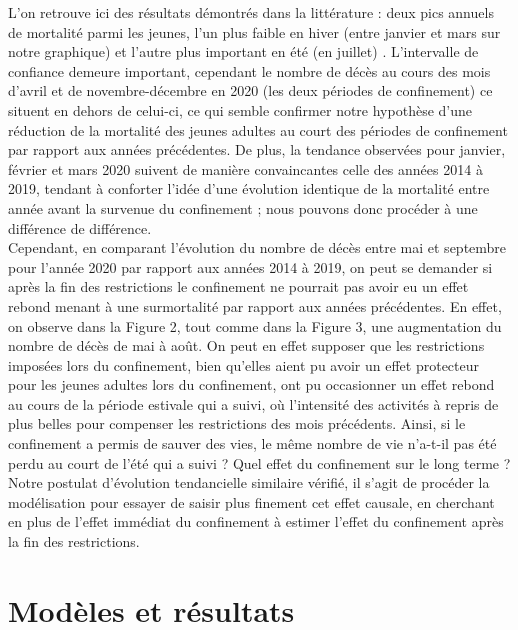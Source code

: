 \documentclass[titlepage]{article}
\begin{document}
L'on retrouve ici des résultats démontrés dans la littérature : deux pics annuels de mortalité parmi les jeunes, l'un plus faible en hiver (entre janvier et mars sur notre graphique) et l'autre plus important en été (en juillet)  \parencite{breton_levolution_2019}. L'intervalle de confiance demeure important, cependant le nombre de décès au cours des mois d'avril et de novembre-décembre en 2020 (les deux périodes de confinement) ce situent en dehors de celui-ci, ce qui semble confirmer notre hypothèse d'une réduction de la mortalité des jeunes adultes au court des périodes de confinement par rapport aux années précédentes. De plus, la tendance observées pour janvier, février et mars 2020 suivent de manière convaincantes celle des années 2014 à 2019, tendant à conforter l'idée d'une évolution identique de la mortalité entre année avant la survenue du confinement ; nous pouvons donc procéder à une différence de différence. \\

Cependant, en comparant l'évolution du nombre de décès entre mai et septembre pour l'année 2020 par rapport aux années 2014 à 2019, on peut se demander si après la fin des restrictions le confinement ne pourrait pas avoir eu un effet rebond menant à une surmortalité par rapport aux années précédentes. En effet, on observe dans la Figure 2, tout comme dans la Figure 3, une augmentation du nombre de décès de mai à août. On peut en effet supposer que les restrictions imposées lors du confinement, bien qu'elles aient pu avoir un effet protecteur pour les jeunes adultes lors du confinement, ont pu occasionner un effet rebond au cours de la période estivale qui a suivi, où l'intensité des activités à repris de plus belles pour compenser les restrictions des mois précédents. Ainsi, si le confinement a permis de sauver des vies, le même nombre de vie n'a-t-il pas été perdu au court de l'été qui a suivi ? Quel effet du confinement sur le long terme ? \\

Notre postulat d'évolution tendancielle similaire vérifié, il s'agit de procéder la modélisation pour essayer de saisir plus finement cet effet causale, en cherchant en plus de l'effet immédiat du confinement à estimer l'effet du confinement après la fin des restrictions. 

\section*{Modèles et résultats}
\end{document}
